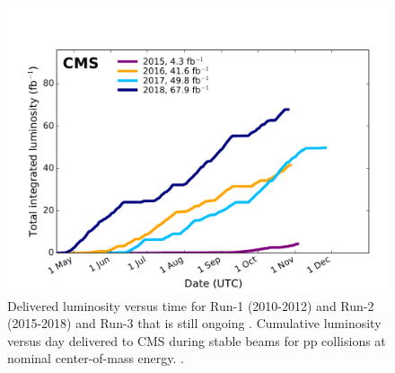 
  \begin{center}
  \begin{figure}[ht]
    \centering
    \includegraphics[scale=.55]{Chapter1/int_lumi_cumulative_pp_2_run2.pdf}
    \caption[Delivered integrated luminosity per year]{Delivered luminosity versus time for Run-1 (2010-2012) and Run-2 (2015-2018) and Run-3 that is still ongoing . Cumulative luminosity versus day delivered to CMS during stable beams for pp collisions at nominal center-of-mass energy.  \cite{wikicern}.}
    \label{lumi_per_year_int}
  \end{figure}
    \end{center}
    
